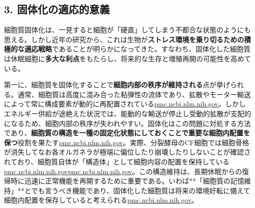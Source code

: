 \subsection{3. 固体化の適応的意義}

細胞質固体化は、一見すると細胞が「硬直」してしまう不都合な状態のようにも思える。しかし近年の研究から、これは生物が\textbf{ストレス環境を乗り切るための積極的な適応戦略}であることが明らかになってきた。すなわち、固体化した細胞質は休眠細胞に\textbf{多大な利点}をもたらし、将来的な生存と増殖再開の可能性を高めている。

第一に、細胞質を固体化することで\textbf{細胞内部の秩序が維持される}点が挙げられる。通常、細胞質は高度に混み合った粘弾性の流体であり、拡散やモーター輸送によって常に構成要素が動的に再配置されている\href{https://pmc.ncbi.nlm.nih.gov/articles/PMC6857596/\#:~:text=N\%C3\%B8rrelykke\%20et\%20al,to\%20environmental\%20changes\%20requires\%20a}{pmc.ncbi.nlm.nih.gov}。しかしエネルギー供給が途絶えた状況では、能動的な輸送が停止し受動的拡散が支配的になるため、細胞内部の秩序が失われやすい。固体化はこの問題に対処する方法であり、\textbf{細胞質の構造を一種の固定化状態にしておくことで重要な細胞内配置を保つ}役割を果たす\href{https://pmc.ncbi.nlm.nih.gov/articles/PMC6857596/\#:~:text=provide\%20experimental\%20evidence\%20that\%2C\%20in,cellular\%20architecture\%20in\%20dormant\%20cells}{pmc.ncbi.nlm.nih.gov}。実際、分裂酵母のCF細胞では細胞骨格が消失してなお各オルガネラが極端に偏位したり崩壊したりしないことが確認されており、細胞質自体が「構造体」として細胞内容の配置を保持している\href{https://pmc.ncbi.nlm.nih.gov/articles/PMC6857596/\#:~:text=spherical\%20shape,cells\%2C\%20the\%20majority\%20of\%20CF}{pmc.ncbi.nlm.nih.gov}\href{https://pmc.ncbi.nlm.nih.gov/articles/PMC6857596/\#:~:text=spherical\%20shape\%2C\%20CF\%20cells\%20slipped,Fig}{pmc.ncbi.nlm.nih.gov}。この構造維持は、長期休眠からの復帰時に迅速に正常機能を再開するために重要である。いわば**「細胞質の記憶維持」**とでも言うべき機能であり、固体化した細胞質は将来の環境好転に備えて細胞内配置を保存していると考えられる\href{https://pmc.ncbi.nlm.nih.gov/articles/PMC6857596/\#:~:text=solidification\%20of\%20yeast\%20cells\%20described,cellular\%20architecture\%20in\%20dormant\%20cells}{pmc.ncbi.nlm.nih.gov}。

